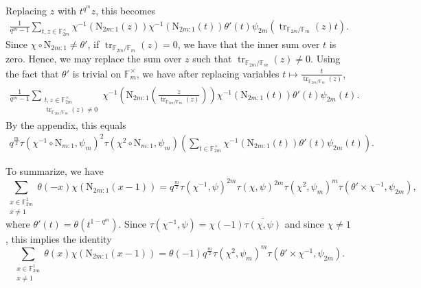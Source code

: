 \documentclass[12pt, reqno]{amsart}
\theoremstyle{definition}
\theoremstyle{definition}
\theoremstyle{definition}
\newcommand{\multiplicativegroup}[1]{#1^{\times}}
\newcommand{\conjugate}[1]{\overline{#1}}
\newcommand{\fieldCharacter}{\psi}
\newcommand{\trace}{\operatorname{tr}}
\newcommand{\FieldNorm}[2]{\mathrm{N}_{#1:#2}}
\newcommand{\finiteField}{\mathbb{F}}
\newcommand{\finiteFieldExtension}[1]{\finiteField_{#1}}
\begin{document}
Replacing $z$ with $t^{q^m} z$, this becomes
\begin{align*}
	\frac{1}{q^m-1}\sum_{t,z \in \multiplicativegroup{\finiteFieldExtension{2m}}} \chi^{-1}\left(\FieldNorm{2m}{1}\left(z\right)\right) \chi^{-1}\left(\FieldNorm{2m}{1}\left(t\right)\right) \theta' \left(t\right) \fieldCharacter_{2m}\left(\trace_{\finiteFieldExtension{2m} \slash \finiteFieldExtension{m}}\left(z\right) t\right).
\end{align*}
Since $\chi \circ \FieldNorm{2m}{1} \ne \theta'$, if $\trace_{\finiteFieldExtension{2m} \slash \finiteFieldExtension{m}}\left(z\right) = 0$, we have that the inner sum over $t$ is zero. Hence, we may replace the sum over $z$ such that $\trace_{\finiteFieldExtension{2m} \slash \finiteFieldExtension{m}}\left(z\right) \ne 0$. Using the fact that $\theta'$ is trivial on $\multiplicativegroup{\finiteFieldExtension{m}}$, we have after replacing variables $t \mapsto \frac{t}{\trace_{\finiteFieldExtension{2m} \slash \finiteFieldExtension{m}}\left(z\right)}$,
\begin{align*}
	\frac{1}{q^m-1}\sum_{\substack{t,z \in \multiplicativegroup{\finiteFieldExtension{2m}}\\
	\trace_{\finiteFieldExtension{2m} \slash \finiteFieldExtension{m}}\left(z\right) \ne 0}} \chi^{-1}\left(\FieldNorm{2m}{1}\left(\frac{z}{\trace_{\finiteFieldExtension{2m} \slash \finiteFieldExtension{m}}\left(z\right) }\right)\right) \chi^{-1}\left(\FieldNorm{2m}{1}\left(t\right)\right) \theta' \left(t\right) \fieldCharacter_{2m}\left(t\right).
\end{align*}
By the appendix, this equals
\begin{align*}
	q^{\frac{m}{2}} \tau\left(\chi^{-1} \circ \FieldNorm{m}{1}, \fieldCharacter_m\right)^2 \tau\left(\chi^{2} \circ \FieldNorm{m}{1}, \fieldCharacter_m\right) \left(\sum_{t \in \multiplicativegroup{\finiteFieldExtension{2m}}} \chi^{-1}\left(\FieldNorm{2m}{1}\left(t\right)\right) \theta' \left(t\right) \fieldCharacter_{2m}\left(t\right)\right).
\end{align*}

To summarize, we have
$$\sum_{\substack{x \in \finiteFieldExtension{2m}^1\\
		x \ne 1}} \theta \left(-x\right) \chi\left(\FieldNorm{2m}{1}\left(x - 1\right)\right) = q^{\frac{m}{2}} \tau\left(\chi^{-1}, \fieldCharacter\right)^{2m} \tau\left(\chi, \fieldCharacter\right)^{2m} \tau\left(\chi^{2}, \fieldCharacter_m\right)^m \tau\left(\theta' \times \chi^{-1}, \fieldCharacter_{2m}\right),$$
	where $\theta'\left(t\right) = \theta\left(t^{1-q^m}\right)$.
Since $\tau\left(\chi^{-1}, \fieldCharacter\right) = \chi\left(-1\right) \conjugate{\tau\left(\chi, \fieldCharacter\right)}$ and since $\chi \ne 1$, this implies the identity
$$\sum_{\substack{x \in \finiteFieldExtension{2m}^1\\
		x \ne 1}} \theta \left(x\right) \chi\left(\FieldNorm{2m}{1}\left(x - 1\right)\right) = \theta\left(-1\right) q^{\frac{m}{2}} \tau\left(\chi^{2}, \fieldCharacter_m\right)^m \tau\left(\theta' \times \chi^{-1}, \fieldCharacter_{2m}\right).$$
\end{document}
